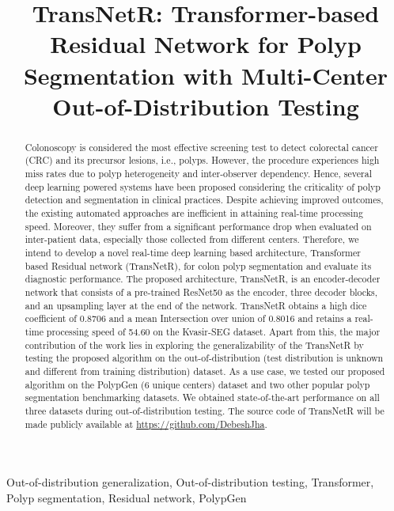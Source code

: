 \documentclass{midl} \usepackage{mwe}
\title[TransNetR for Out-of-Distribution Polyp Segmentation]{TransNetR: Transformer-based Residual Network for Polyp Segmentation with Multi-Center Out-of-Distribution Testing}
\begin{document}
\maketitle

\begin{abstract}
Colonoscopy is considered the most effective screening test to detect colorectal cancer (CRC) and its precursor lesions, i.e., polyps. However, the procedure experiences high miss rates due to polyp heterogeneity and inter-observer dependency. Hence, several deep learning powered systems have been proposed considering the criticality of polyp detection and segmentation in clinical practices. Despite achieving improved outcomes, the existing automated approaches are inefficient in attaining real-time processing speed. Moreover, they suffer from a significant performance drop when evaluated on inter-patient data, especially those collected from different centers. Therefore, we intend to develop a novel real-time deep learning based architecture, Transformer based Residual network (TransNetR), for colon polyp segmentation and evaluate its diagnostic performance. The proposed architecture, TransNetR, is an encoder-decoder network that consists of a pre-trained ResNet50 as the encoder, three decoder blocks, and an upsampling layer at the end of the network. TransNetR obtains a high dice coefficient of 0.8706 and a mean Intersection over union of 0.8016 and retains a real-time processing speed of 54.60 on the Kvasir-SEG dataset. Apart from this,  the major contribution of the work lies in exploring the generalizability of the TransNetR by testing the proposed algorithm on the out-of-distribution (test distribution is unknown and different from training distribution) dataset. As a use case, we tested our proposed algorithm on the PolypGen (6 unique centers) dataset and two other popular polyp segmentation benchmarking datasets. We obtained state-of-the-art performance on all three datasets during out-of-distribution testing. The source code of TransNetR will be made publicly available at \url{https://github.com/DebeshJha}. 

\end{abstract}

\begin{keywords}
Out-of-distribution generalization, Out-of-distribution testing, Transformer, Polyp segmentation, Residual network, PolypGen
\end{keywords}
\end{document}
